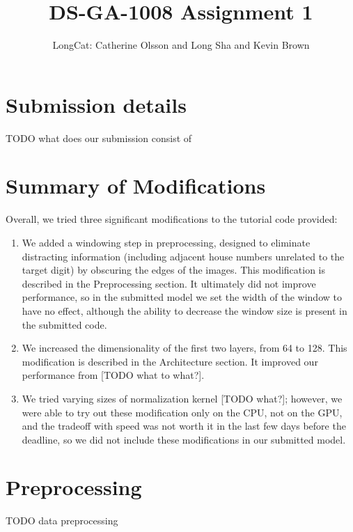 \documentclass{article}
\title{DS-GA-1008 Assignment 1}
\author{LongCat: Catherine Olsson and Long Sha and Kevin Brown}
\begin{document}
\maketitle


\section{Submission details}

TODO what does our submission consist of

\section{Summary of Modifications}

Overall, we tried three significant modifications to the tutorial code provided:
\begin{enumerate}
\item We added a windowing step in preprocessing, designed to eliminate distracting information (including adjacent house numbers unrelated to the target digit) by obscuring the edges of the images. This modification is described in the Preprocessing section. It ultimately did not improve performance, so in the submitted model we set the width of the window to have no effect, although the ability to decrease the window size is present in the submitted code.
\item We increased the dimensionality of the first two layers, from 64 to 128. This modification is described in the Architecture section. It improved our performance from [TODO what to what?].
\item We tried varying sizes of normalization kernel [TODO what?]; however, we were able to try out these modification only on the CPU, not on the GPU, and the tradeoff with speed was not worth it in the last few days before the deadline, so we did not include these modifications in our submitted model.
\end{enumerate}

\section{Preprocessing}
\label{preprocessing}

TODO data preprocessing
\end{document}
